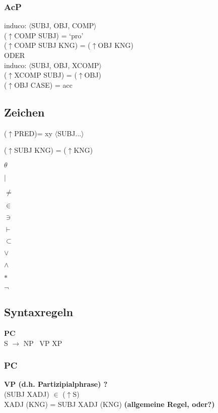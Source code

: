 \documentclass[12pt,a4paper]{article}
\begin{document}
\subsubsection{AcP}

induco: $\langle$SUBJ, OBJ, COMP$\rangle$\\
($\uparrow$COMP SUBJ) = `pro'\\
($\uparrow$COMP SUBJ KNG) = ($\uparrow$OBJ KNG)\\

ODER\\
induco: $\langle$SUBJ, OBJ, XCOMP$\rangle$\\
($\uparrow$XCOMP SUBJ) = ($\uparrow$OBJ)\\
($\uparrow$OBJ CASE) = acc\\

\subsection{Zeichen}
($\uparrow$PRED)= xy $\langle$SUBJ...$\rangle$

($\uparrow$SUBJ KNG) = ($\uparrow$KNG)

$\theta$

$\mid$

$\neq$

$\in$

$\ni$

$\vdash$

$\subset$

$\vee$

$\wedge$

$\ast$

$\neg$


\subsection{Syntaxregeln}

\textbf{PC}\\
S $\rightarrow$ NP \, VP \: XP\\


\subsubsection{PC}

\textbf{VP (d.h. Partizipialphrase) ?}\\

(SUBJ XADJ) $\in$ ($\uparrow$S)\\
XADJ (KNG) = SUBJ XADJ (KNG) \textbf{(allgemeine Regel, oder?)} \\
\end{document}
